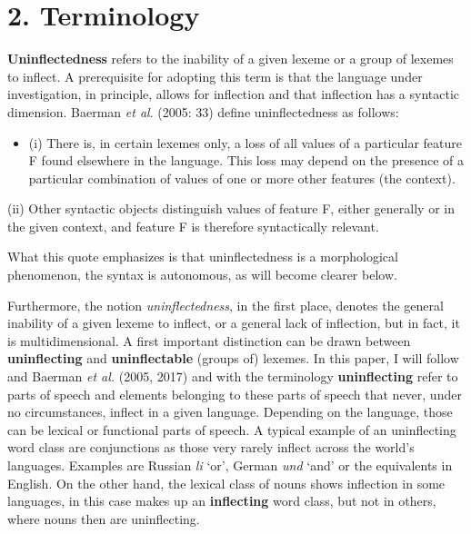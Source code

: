 \documentclass[output=paper]{langscibook}
\begin{document}
\section{2. Terminology}

\textbf{Uninflectedness} refers to the inability of a given lexeme or a group of lexemes to inflect. A prerequisite for adopting this term is that the language under investigation, in principle, allows for inflection and that inflection has a syntactic dimension. Baerman \textit{et al}. (2005: 33) define uninflectedness as follows:

\begin{itemize}
\item \begin{styleBeispielCinqueKapitel}
(i) There is, in certain lexemes only, a loss of all values of a particular feature F found elsewhere in the language. This loss may depend on the presence of a particular combination of values of one or more other features (the context). 
\end{styleBeispielCinqueKapitel}
\end{itemize}
\begin{styleBeispielCinqueKapitel}
(ii) Other syntactic objects distinguish values of feature F, either generally or in the given context, and feature F is therefore syntactically relevant. 
\end{styleBeispielCinqueKapitel}

What this quote emphasizes is that uninflectedness is a morphological phenomenon, the syntax is autonomous, as will become clearer below. 

Furthermore, the notion \textit{uninflectedness}, in the first place, denotes the general inability of a given lexeme to inflect, or a general lack of inflection, but in fact, it is multidimensional. A first important distinction can be drawn between \textbf{uninflecting} and \textbf{uninflectable} (groups of) lexemes. In this paper, I will follow \citet[142]{Spencer2020} and Baerman \textit{et al.} (2005, 2017) and with the terminology \textbf{uninflecting} refer to parts of speech and elements belonging to these parts of speech that never, under no circumstances, inflect in a given language. Depending on the language, those can be lexical or functional parts of speech. A typical example of an uninflecting word class are conjunctions as those very rarely inflect across the world’s languages. Examples are Russian \textit{li} ‘or’, German \textit{und} ‘and’ or the equivalents in English. On the other hand, the lexical class of nouns shows inflection in some languages, in this case makes up an \textbf{inflecting} word class, but not in others, where nouns then are uninflecting.
\end{document}
